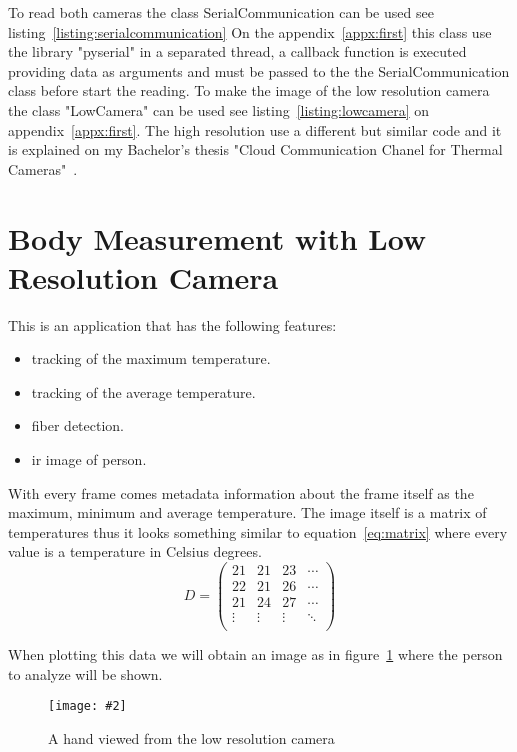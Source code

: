 \documentclass[hidelinks,11pt,a4paper,oneside,article]{memoir}
\newcommand{\putimage}[3][10] %
{
\begin{figure}[h]
    \centering
    \captionsetup{justification=centering}
    \texttt{[image: \#2]}
    \caption{#3}
    \label{fig:#2}
\end{figure}
}
\begin{document}
To read both cameras the class SerialCommunication can be used see listing~\ref{listing:serialcommunication} On the appendix~\ref{appx:first} this class use the library "pyserial" in a separated thread, a callback function is executed providing data as arguments and must be passed to the  the SerialCommunication class before start the reading. To make the image of the low resolution camera the class "LowCamera" can be used see listing~\ref{listing:lowcamera} on appendix~\ref{appx:first}. The high resolution use a different but similar code and it is explained on my Bachelor's thesis "Cloud Communication Chanel for Thermal Cameras"~\cite{alvaroCloud}.


\section{Body Measurement with Low Resolution Camera}\label{sec:body-measurement-with-low-resolution-ir-camera}
This is an application that has the following features:
\begin{itemize}
    \item tracking of the maximum temperature.
    \item tracking of the average temperature.
    \item fiber detection.
    \item \gls{ir} image of person.
\end{itemize}
With every frame comes metadata information about the frame itself as the maximum, minimum and average temperature. The image itself is a matrix of temperatures thus it looks something similar to equation~\ref{eq:matrix} where every value is a temperature in Celsius degrees.
\begin{equation}
\label{eq:matrix}
D = 
\begin{pmatrix}
21 & 21 & 23 & \cdots \\
22 & 21 & 26 & \cdots \\
21 & 24 & 27 & \cdots \\
\vdots & \vdots  & \vdots  & \ddots   \\

\end{pmatrix}
\end{equation}

When plotting this data we will obtain an image as in figure~\ref{fig:ir-hand} where the person to analyze will be shown.

    \putimage{ir-hand}{A hand viewed from the low resolution camera}
\end{document}
